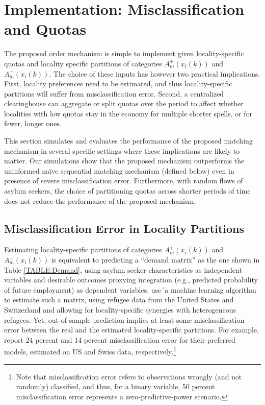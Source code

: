 \documentclass[12pt,fleqn]{article}
\begin{document}
\section{Implementation: Misclassification and Quotas}\label{SEC:simulations}
The proposed order mechanism is simple to implement given locality-specific quotas and locality specific partitions of categories $A^+_m(x_i(k))$ and $A^-_m(x_i(k))$. The choice of these inputs has however two practical implications. First, locality preferences need to be estimated, and thus locality-specific partitions will suffer from misclassification error. Second, a centralized clearinghouse can aggregate or split quotas over the period to affect whether localities with low quotas stay in the economy for multiple shorter spells, or for fewer, longer ones. 

This section simulates and evaluates the performance of the proposed matching mechanism in several specific settings where these implications are likely to matter. Our simulations show that the proposed mechanism outperforms the uninformed na\"{i}ve sequential matching mechanism (defined below) even in presence of severe misclassification error. Furthermore, with random flows of asylum seekers, the choice of partitioning quotas across shorter periods of time does not reduce the performance of the proposed mechanism.

\subsection{Misclassification Error in Locality Partitions}
Estimating locality-specific partitions of categories $A^+_m(x_i(k))$ and $A^-_m(x_i(k))$ is equivalent to predicting a ``demand matrix'' as the one shown in Table \ref{TABLE:Demand}, using asylum seeker characteristics as independent variables and desirable outcomes proxying integration (e.g., predicted probability of future employment) as dependent variables. \cite{bib:BansakEtAl} use´a machine learning algorithm to estimate such a matrix, using refugee data from the United States and Switzerland and allowing for locality-specific synergies with heterogeneous refugees. Yet, out-of-sample prediction implies at least some misclassification error between the real and the estimated locality-specific partitions. For example, \cite{bib:BansakEtAl} report 24 percent and 14 percent misclassification error for their preferred models, estimated on US and Swiss data, respectively.\footnote{Note that misclassification error refers to observations wrongly (and not randomly) classified, and thus, for a binary variable, 50 percent misclassification error represents a zero-predictive-power scenario.}
\end{document}
